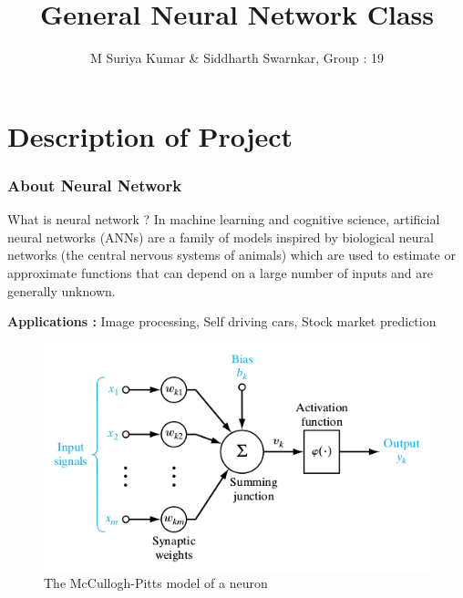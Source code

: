 \documentclass[10pt]{beamer}
\title{General Neural Network Class}
\institute{Indian Institute of Technology Bombay
}
\author{M Suriya Kumar \& Siddharth Swarnkar, Group : 19}
\date{}
\begin{document}
\begin{frame}[plain]
\maketitle
\end{frame}

\section{Description of Project}
\begin{frame}
\frametitle{About Neural Network}
\begin{block}{What is neural network ?}
In machine learning and cognitive science, artificial neural networks (ANNs) are a family
of models inspired by biological neural networks (the central nervous systems of
animals) which are used to estimate or approximate functions that can depend on a 
large number of inputs and are generally unknown.

\textbf{Applications : } Image processing, Self driving cars, Stock market prediction 
\end{block}

\begin{figure}
\includegraphics[scale=0.26]{nnnode.png}
\caption{The McCullogh-Pitts model of a neuron}
\end{figure}
\end{frame}
\end{document}
